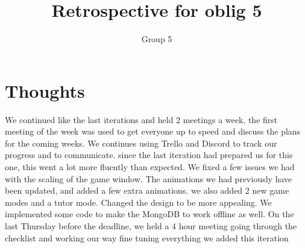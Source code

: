\documentclass{article}
\title{Retrospective for oblig 5}
\author{Group 5}
\date{}
\begin{document}
    \maketitle

    \section{Thoughts}
    \noindent

    We continued like the last iterations and held 2 meetings a week, the first meeting of the week was used to get everyone up to speed and discuss the plans for the coming weeks.
    We continues using Trello and Discord to track our progress and to communicate. since the last iteration had prepared us for this one, this went a lot more fluently than expected.
    We fixed a few issues we had with the scaling of the game window.
    The animations we had previously have been updated, and added a few extra animations. we also added 2 new game modes and a tutor mode.
    Changed the design to be more appealing. We implemented some code to make the MongoDB to work offline as well.
    On the last Thursday before the deadline, we held a 4 hour meeting going through the checklist and working our way fine tuning everything we added
    this iteration
\end{document}

